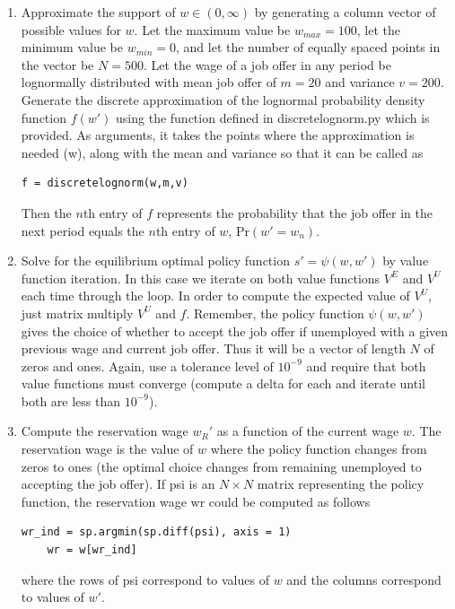 \begin{problem}
\begin{enumerate}

   \item Approximate the support of $w\in(0,\infty)$ by generating a column vector of possible values for $w$. Let the maximum value be $w_{max} = 100$, let the minimum value be $w_{min} = 0$, and let the number of equally spaced points in the vector be $N = 500$. Let the wage of a job offer in any period be lognormally distributed with mean job offer of $m=20$ and variance $v =200$.  Generate the discrete approximation of the lognormal probability density function $f(w')$ using the function defined in discretelognorm.py which is provided.  As arguments, it takes the points where the approximation is needed (w), along with the mean and variance so that it can be called as

\begin{lstlisting}[style=python]
f = discretelognorm(w,m,v)
\end{lstlisting}

    Then the $n$th entry of $f$ represents the probability that the job offer in the next period equals the $n$th entry of $w$, $\text{Pr}(w' = w_n)$.

   \item Solve for the equilibrium optimal policy function $s' = \psi(w,w')$ by value function iteration.  In this case we iterate on both value functions $V^E$ and $V^U$ each time through the loop.  In order to compute the expected value of $V^U$, just matrix multiply $V^U$ and $f$. Remember, the policy function $\psi(w,w')$ gives the choice of whether to accept the job offer if unemployed with a given previous wage and current job offer.  Thus it will be a vector of length $N$ of zeros and ones.  Again, use a tolerance level of $10^{-9}$ and require that both value functions must converge (compute a delta for each and iterate until both are less than $10^{-9}$).

   \item Compute the reservation wage $w_R'$ as a function of the current wage $w$.  The reservation wage is the value of $w$ where the policy function changes from zeros to ones (the optimal choice changes from remaining unemployed to accepting the job offer).  If psi is an $N\times N$ matrix representing the policy function, the reservation wage wr could be computed as follows
   \begin{lstlisting}[style = python]
    wr_ind = sp.argmin(sp.diff(psi), axis = 1)
    wr = w[wr_ind]
   \end{lstlisting}
	where the rows of psi correspond to values of $w$ and the columns correspond to values of $w'$.


\end{enumerate}
\end{problem}
